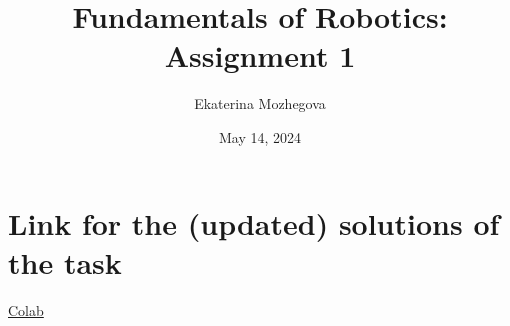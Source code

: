 \documentclass{article}
\title{Fundamentals of Robotics: Assignment 1}
\author{Ekaterina Mozhegova}
\date{May 14, 2024}
\begin{document}
\maketitle

\section{Link for the (updated) solutions of the task}

\href{https://colab.research.google.com/drive/170z2YVaeu9kHEuC4bXIWQqJ82eWDJoS2?usp=sharing}{Colab}
\end{document}
